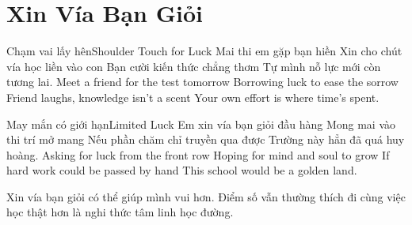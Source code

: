 \chapter{Xin Vía Bạn Giỏi}

\begin{tutuyetbox}{Chạm vai lấy hên}{Shoulder Touch for Luck}
Mai thi em gặp bạn hiền
Xin cho chút vía học liền vào con
Bạn cười kiến thức chẳng thơm
Tự mình nỗ lực mới còn tương lai.
\tcblower
Meet a friend for the test tomorrow 
Borrowing luck to ease the sorrow 
Friend laughs, knowledge isn't a scent 
Your own effort is where time's spent.
\end{tutuyetbox}

\begin{tutuyetbox}{May mắn có giới hạn}{Limited Luck}
Em xin vía bạn giỏi đầu hàng
Mong mai vào thi trí mở mang
Nếu phần chăm chỉ truyền qua được
Trường này hẳn đã quá huy hoàng.
\tcblower
Asking for luck from the front row 
Hoping for mind and soul to grow 
If hard work could be passed by hand 
This school would be a golden land.
\end{tutuyetbox}

\begin{ghichu}
Xin vía bạn giỏi có thể giúp mình vui hơn. Điểm số vẫn thường thích đi cùng việc học thật hơn là nghi thức tâm linh học đường.
\end{ghichu}